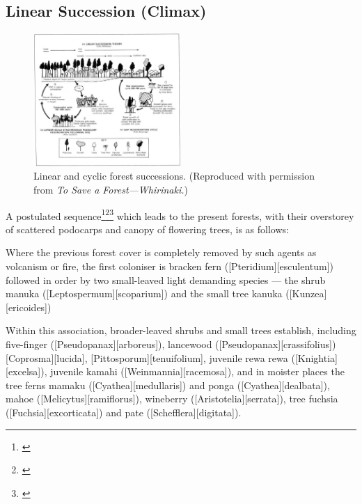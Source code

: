 \subsection[Linear Succession (Climax)]{Linear Succession (Climax)}

\begin{figure}
	\includegraphics[width=0.5\textwidth]{graphics/figure64forestsuccession.jpg}
	\centering
	\caption[Linear and cyclic forest successions]{Linear and cyclic forest successions. (Reproduced with permission from \emph{To Save a Forest---Whirinaki.})}%
	\label{fig:64forestsuccession}
\end{figure}

A postulated sequence\footnote{\cite{cockayne1928vegetation}}\footnote{\cite{mckelvey1963synecology}}\footnote{\cite{mckelvey1973pattern}} which leads to the present forests, with their overstorey of scattered podocarps and canopy of flowering trees, is as follows:

Where the previous forest cover is completely removed by such agents as volcanism or fire, the first coloniser is bracken fern ([Pteridium][esculentum]) followed in order by two small-leaved light demanding species --- the shrub manuka ([Leptospermum][scoparium]) and the small tree kanuka ([Kunzea][ericoides])

Within this association, broader-leaved shrubs and small trees establish, including five-finger ([Pseudopanax][arboreus]), lancewood ([Pseudopanax][crassifolius]) [Coprosma][lucida], [Pittosporum][tenuifolium], juvenile rewa rewa ([Knightia][excelsa]), juvenile kamahi ([Weinmannia][racemosa]), and in moister places the tree ferns mamaku ([Cyathea][medullaris]) and ponga ([Cyathea][dealbata]), mahoe ([Melicytus][ramiflorus]), wineberry ([Aristotelia][serrata]), tree fuchsia ([Fuchsia][excorticata]) and pate ([Schefflera][digitata]).

